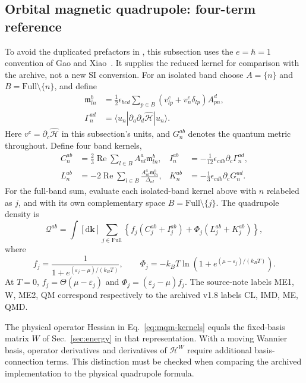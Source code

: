 \documentclass[prx,amsmath,amssymb,superscriptaddress,longbibliography]{revtex4-2}
\newcommand{\Rea}{\operatorname{Re}}
\newcommand{\dd}{\mathrm{d}}
\newcommand{\code}[1]{\texttt{\detokenize{#1}}}
\begin{document}
\subsection{Orbital magnetic quadrupole: four-term reference}
\label{sec:mqm}
To avoid the duplicated prefactors in \code{Wannier.tex}, this subsection
uses the $e=\hbar=1$ convention of Gao and Xiao~\cite{GaoXiao2018}.
It supplies the reduced kernel for comparison with the archive, not a new SI conversion.
For an isolated band choose $A=\{n\}$ and $B=\mathrm{Full}\setminus\{n\}$, and define
\begin{align}
 \mathfrak m_{ln}^{b}
 &=\frac12\epsilon_{bcd}\sum_{p\in B}
       (v_{lp}^c+v_n^c\delta_{lp})A_{pn}^d,\label{eq:interband-moment}\\
 \Gamma_n^{ad}&=\langle u_n|\partial_a\partial_d\hat{\mathcal H}|u_n\rangle.
\end{align}
Here $v^c=\partial_c\hat{\mathcal H}$ in this subsection's units,
and $G_n^{ab}$ denotes the quantum metric throughout.
Define four band kernels,
\begin{align}
 C_n^{ab}&=\frac23\Rea\sum_{l\in B}A_{nl}^a\mathfrak m_{ln}^b,
 &I_n^{ab}&=-\frac1{12}\epsilon_{cdb}\partial_c\Gamma_n^{ad},
 \nonumber\\
 L_n^{ab}&=-2\Rea\sum_{l\in B}
                 \frac{A_{nl}^a\mathfrak m_{ln}^b}{\Delta_{nl}},
 &K_n^{ab}&=-\frac13\epsilon_{cdb}\partial_cG_n^{ad}.
 \label{eq:mqm-kernels}
\end{align}
For the full-band sum, evaluate each isolated-band kernel above with
$n$ relabeled as $j$, and with its own complementary space
$B=\mathrm{Full}\setminus\{j\}$. The quadrupole density is
\begin{equation}
 \mathcal Q^{ab}=\int[\dd\bm k]\sum_{j\in\mathrm{Full}}
 \left\{f_j(C_j^{ab}+I_j^{ab})+\Phi_j(L_j^{ab}+K_j^{ab})\right\},
 \label{eq:mqm}
\end{equation}
where
\begin{equation}
 f_j=\frac1{1+e^{(\varepsilon_j-\mu)/(k_BT)}},\qquad
 \Phi_j=-k_BT\ln\left(1+e^{(\mu-\varepsilon_j)/(k_BT)}\right).
 \label{eq:grand-potential}
\end{equation}
At $T=0$, $f_j=\Theta(\mu-\varepsilon_j)$ and
$\Phi_j=(\varepsilon_j-\mu)f_j$.
The source-note labels ME1, W, ME2, QM correspond respectively to the
archived v1.8 labels CL, IMD, ME, QMD.

The physical operator Hessian in Eq.~\eqref{eq:mqm-kernels} equals the fixed-basis
matrix $W$ of Sec.~\ref{sec:energy} in that representation.
With a moving Wannier basis, operator derivatives and derivatives of
$\mathcal H^W$ require additional basis-connection terms.
This distinction must be checked when comparing the archived \code{DerWln}
implementation to the physical quadrupole formula.
\end{document}
